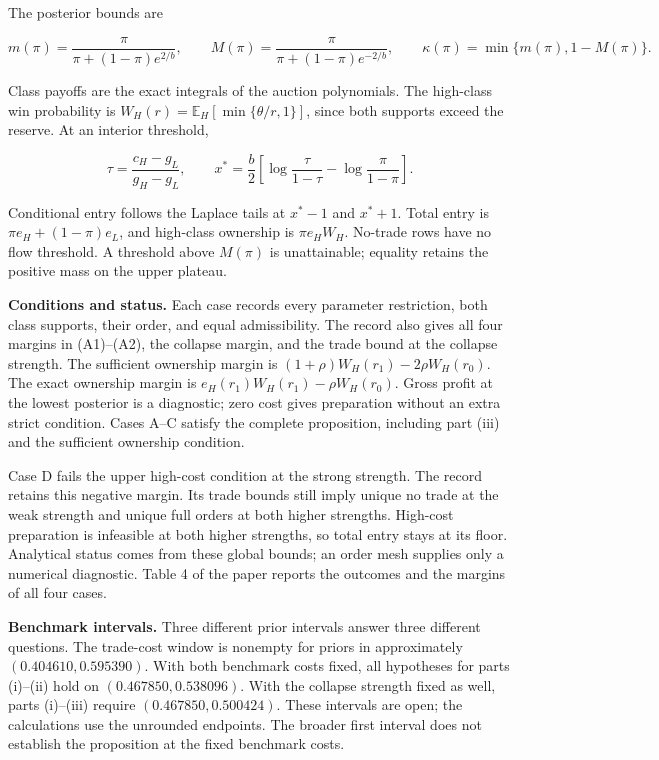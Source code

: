 \documentclass[
  11pt,
]{article}
\newcounter{none} %
\begin{document}
The posterior bounds are

\[
m(\pi)=\frac{\pi}{\pi+(1-\pi)e^{2/b}},\qquad
M(\pi)=\frac{\pi}{\pi+(1-\pi)e^{-2/b}},\qquad
\kappa(\pi)=\min\{m(\pi),1-M(\pi)\}.
\]

Class payoffs are the exact integrals of the auction polynomials. The
high-class win probability is
\(W_H(r)=\mathbb E_H[\min\{\theta/r,1\}]\), since both supports exceed
the reserve. At an interior threshold,

\[
\tau=\frac{c_H-g_L}{g_H-g_L},\qquad
x^*=\frac b2\left[\log\frac{\tau}{1-\tau}-\log\frac{\pi}{1-\pi}\right].
\]

Conditional entry follows the Laplace tails at \(x^*-1\) and
\(x^*+1\). Total entry is \(\pi e_H+(1-\pi)e_L\), and high-class
ownership is \(\pi e_HW_H\). No-trade rows have no flow threshold. A
threshold above \(M(\pi)\) is unattainable; equality retains the
positive mass on the upper plateau.

\textbf{Conditions and status.} Each case records every parameter
restriction, both class supports, their order, and equal admissibility.
The record also gives all four margins in (A1)--(A2), the collapse
margin, and the trade bound at the collapse strength. The sufficient
ownership margin is \((1+\rho)W_H(r_1)-2\rho W_H(r_0)\). The exact
ownership margin is \(e_H(r_1)W_H(r_1)-\rho W_H(r_0)\). Gross profit at
the lowest posterior is a diagnostic; zero cost gives preparation
without an extra strict condition. Cases A--C satisfy the complete
proposition, including part (iii) and the sufficient ownership
condition.

Case D fails the upper high-cost condition at the strong strength. The
record retains this negative margin. Its trade bounds still imply unique
no trade at the weak strength and unique full orders at both higher
strengths. High-cost preparation is infeasible at both higher strengths,
so total entry stays at its floor. Analytical status comes from these
global bounds; an order mesh supplies only a numerical diagnostic.
Table 4 of the paper reports the outcomes and the margins of all four
cases.

\textbf{Benchmark intervals.} Three different prior intervals answer
three different questions. The trade-cost window is nonempty for priors
in approximately
\((0.404610,0.595390)\). With
both benchmark costs fixed, all hypotheses for parts (i)--(ii) hold on
\((0.467850,0.538096)\). With the
collapse strength fixed as well, parts (i)--(iii) require
\((0.467850,0.500424)\).
These intervals are open; the calculations use the unrounded endpoints.
The broader first interval does not establish the proposition at the
fixed benchmark costs.
\end{document}
